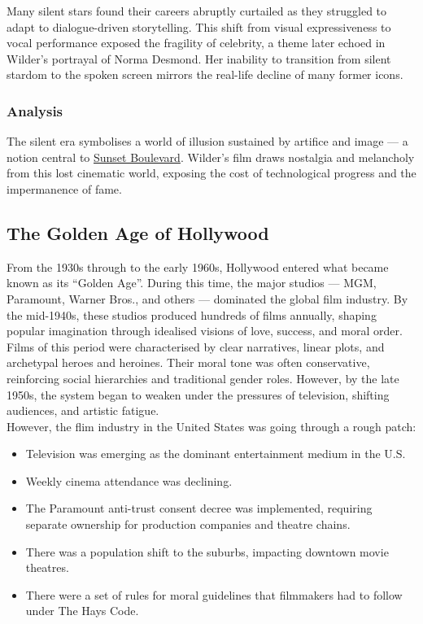 \documentclass[a4paper]{article}
\begin{document}
Many silent stars found their careers abruptly curtailed as they struggled to adapt to dialogue-driven storytelling. This shift from visual expressiveness to vocal performance exposed the fragility of celebrity, a theme later echoed in Wilder’s portrayal of Norma Desmond. Her inability to transition from silent stardom to the spoken screen mirrors the real-life decline of many former icons.\\

\subsubsection{Analysis}
The silent era symbolises a world of illusion sustained by artifice and image — a notion central to \underline{Sunset Boulevard}. Wilder’s film draws nostalgia and melancholy from this lost cinematic world, exposing the cost of technological progress and the impermanence of fame.\\

\subsection{The Golden Age of Hollywood}
From the 1930s through to the early 1960s, Hollywood entered what became known as its “Golden Age”. During this time, the major studios — MGM, Paramount, Warner Bros., and others — dominated the global film industry. By the mid-1940s, these studios produced hundreds of films annually, shaping popular imagination through idealised visions of love, success, and moral order.\\

Films of this period were characterised by clear narratives, linear plots, and archetypal heroes and heroines. Their moral tone was often conservative, reinforcing social hierarchies and traditional gender roles. However, by the late 1950s, the system began to weaken under the pressures of television, shifting audiences, and artistic fatigue.\\

However, the flim industry in the United States was going through a rough patch:
\begin{itemize}
\item Television was emerging as the dominant entertainment medium in the U.S.
\item Weekly cinema attendance was declining.
\item The Paramount anti-trust consent decree was implemented, requiring separate ownership for production companies and theatre chains.
\item There was a population shift to the suburbs, impacting downtown movie theatres.
\item There were a set of rules for moral guidelines that filmmakers had to follow under The Hays Code. 
\end{itemize}
\end{document}
